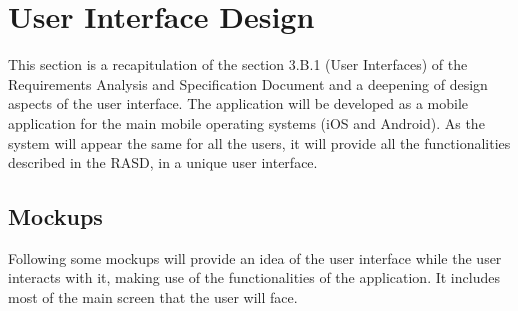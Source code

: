 %
%
\chapter{User Interface Design}
%
\label{cap:userinterfacedesign}
%
%
This section is a recapitulation of the section 3.B.1 (User Interfaces) of the Requirements Analysis and Specification Document and a deepening of design aspects of the user interface.
The application will be developed as a mobile application for the main mobile operating systems (iOS and Android).
As the system will appear the same for all the users, it will provide all the functionalities described in the RASD, in a unique user interface.
%
%
%
%
\section{Mockups}
Following some mockups will provide an idea of the user interface while the user interacts with it, making use of the functionalities of the application. It includes most of the main screen that the user will face.

